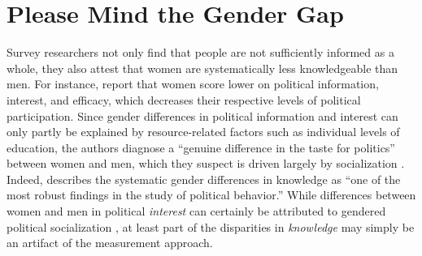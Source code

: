 \section*{Please Mind the Gender Gap}

Survey researchers not only find that people are not sufficiently informed as a whole, they also attest that women are systematically less knowledgeable than men. For instance, \citet{verba1997knowing} report that women score lower on political information, interest, and efficacy, which decreases their respective levels of political participation. Since gender differences in political information and interest can only partly be explained by resource-related factors such as individual levels of education, the authors diagnose a ``genuine difference in the taste for politics'' between women and men, which they suspect is driven largely by socialization \citep[see also][]{wolak2011roots}. Indeed, \citet[117]{dow2009gender} describes the systematic gender differences in knowledge as ``one of the most robust findings in the study of political behavior.'' While differences between women and men in political \textit{interest} can certainly be attributed to gendered political socialization \citep{bos2021one,wolak2020self}, at least part of the disparities in \textit{knowledge} may simply be an artifact of the measurement approach.

